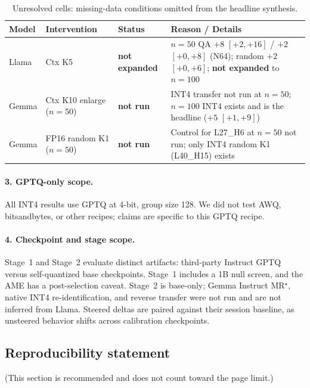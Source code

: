 \documentclass{article} %
\begin{document}
\begin{table}[b]
\vspace{-8pt}
\caption{Unresolved cells: missing-data conditions omitted from the headline synthesis.}
\label{tab:unresolved-cells}
\centering\scriptsize
\setlength{\tabcolsep}{3pt}
\begin{tabular}{p{0.55in}p{1.35in}p{0.75in}p{2.5in}}
\toprule
Model & Intervention & Status & Reason / Details \\
\midrule
Llama & Ctx K5 & \textbf{not expanded} & $n{=}50$ QA $+8$ $[+2,+16]$ / $+2$ $[+0,+8]$ (N64); random $+2$ $[+0,+6]$; \textbf{not expanded} to $n{=}100$ \\
Gemma & Ctx K10 enlarge ($n{=}50$) & \textbf{not run} & INT4 transfer not run at $n{=}50$; $n{=}100$ INT4 exists and is the headline ($+5$ $[+1,+9]$) \\
Gemma & FP16 random K1 ($n{=}50$) & \textbf{not run} & Control for L27\_H6 at $n{=}50$ not run; only INT4 random K1 (L40\_H15) exists \\
\bottomrule
\end{tabular}
\vspace{-8pt}
\end{table}

\paragraph{3. GPTQ-only scope.} All INT4 results use GPTQ at 4-bit, group size 128. We did not test AWQ, bitsandbytes, or other recipes; claims are specific to this GPTQ recipe.

\paragraph{4. Checkpoint and stage scope.} Stage~1 and Stage~2 evaluate distinct artifacts: third-party Instruct GPTQ versus self-quantized base checkpoints. Stage~1 includes a 1B null screen, and the AME has a post-selection caveat. Stage~2 is base-only; Gemma Instruct MR$^\star$, native INT4 re-identification, and reverse transfer were not run and are not inferred from Llama. Steered deltas are paired against their session baseline, as unsteered behavior shifts across calibration checkpoints.

\clearpage
\subsection*{Reproducibility statement}

(This section is recommended and does not count toward the page limit.)
\end{document}
